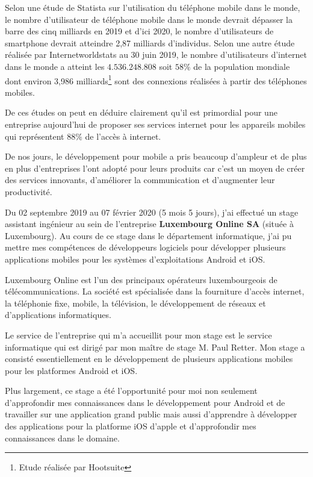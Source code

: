 	Selon une étude de Statista sur l'utilisation du téléphone mobile dans le monde, le nombre d'utilisateur de téléphone mobile dans le monde devrait dépasser la barre des cinq milliards en 2019 et d'ici 2020, le nombre d'utilisateurs de smartphone devrait atteindre 2,87 milliards d'individus. Selon une autre étude réalisée par \og Internetworldstats \fg{,}  au 30 juin 2019, le nombre d'utilisateurs d'internet dans le monde a atteint les $4.536.248.808$ soit $58 \% $ de la population mondiale dont environ 3,986 milliards\footnote{Etude réalisée par Hootsuite} sont des connexions réalisées à partir des téléphones mobiles.
	
	De ces études on peut en déduire clairement qu'il est primordial pour une entreprise aujourd'hui de proposer ses services internet pour les appareils mobiles  qui  représentent $88\% $ de l'accès à internet. 
	
	De nos jours, le développement pour mobile a pris beaucoup d'ampleur  et de plus en plus d'entreprises l'ont adopté pour leurs produits car c'est un moyen de créer des services innovants, d'améliorer la communication et d'augmenter leur productivité.
	
	Du 02 septembre 2019 au 07 février 2020 (5 mois 5 jours), j'ai effectué un stage assistant ingénieur au sein de l'entreprise \textbf{Luxembourg Online SA} (située à Luxembourg). Au cours de ce stage dans le département informatique, j'ai pu mettre mes compétences de développeurs logiciels pour développer plusieurs applications mobiles pour les systèmes d'exploitations Android et iOS.
	
	Luxembourg Online est l'un des principaux opérateurs luxembourgeois de télécommunications. La société est spécialisée dans la fourniture d'accès internet, la téléphonie fixe, mobile, la télévision, le développement de réseaux et d'applications informatiques.
	
	Le service de l'entreprise qui m'a accueillit pour mon stage est le service informatique qui est dirigé par mon maître de stage M. Paul Retter. Mon stage a consisté essentiellement en le développement de plusieurs applications mobiles pour les platformes Android et iOS.
	
	Plus largement, ce stage a été l'opportunité pour moi non seulement d'approfondir mes connaissances dans le développement pour Android et de travailler sur une application grand public mais aussi d'apprendre à développer des applications pour la platforme iOS d'apple et d'approfondir mes connaissances dans le domaine.
	
